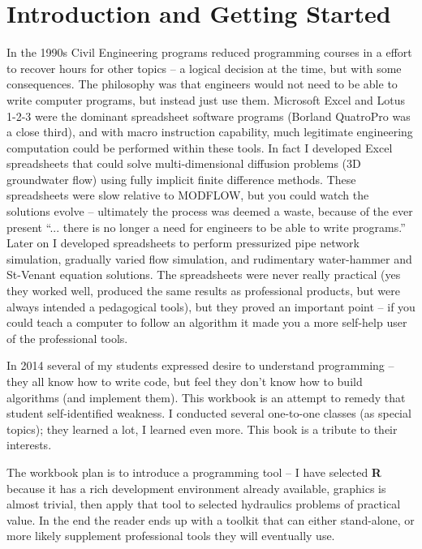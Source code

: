 \section{Introduction and Getting Started}
In the 1990s Civil Engineering programs reduced programming courses in a effort to recover hours for other topics -- a logical decision at the time, but with some consequences.  
The philosophy was that engineers would not need to be able to write computer programs, but instead just use them.  
Microsoft Excel and Lotus 1-2-3 were the dominant spreadsheet software programs (Borland QuatroPro was a close third), and with macro instruction capability, much legitimate engineering computation could be performed within these tools.  
In fact I developed Excel spreadsheets that could solve multi-dimensional diffusion problems (3D groundwater flow) using fully implicit finite difference methods.  These spreadsheets were slow relative to MODFLOW, but you could watch the solutions evolve -- ultimately the process was deemed a waste, because of the ever present ``... there is no longer a need for engineers to be able to write programs.''
Later on I developed spreadsheets to perform pressurized pipe network simulation, gradually varied flow simulation, and rudimentary water-hammer and St-Venant equation solutions.  The spreadsheets were never really practical (yes they worked well, produced the same results as professional products, but were always intended a pedagogical tools), but they proved an important point -- if you could teach a computer to follow an algorithm it made you a more self-help user of the professional tools.

In 2014 several of my students expressed desire to understand programming -- they all know how to write code, but feel they don't know how to build algorithms (and implement them).   This workbook is an attempt to remedy that student self-identified weakness.   I conducted several one-to-one classes (as special topics); they learned a lot, I learned even more.  This book is a tribute to their interests.

The workbook plan is to introduce a programming tool -- I have selected \textbf{R} because it has a rich development environment already available, graphics is almost trivial, then apply that tool to selected hydraulics problems of practical value.  In the end the reader ends up with a toolkit that can either stand-alone, or more likely supplement professional tools they will eventually use.

